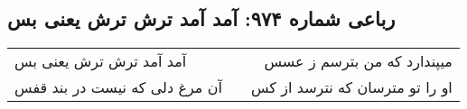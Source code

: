 \begin{center}
\section*{رباعی شماره ۹۷۴: آمد آمد ترش ترش یعنی بس}
\label{sec:0974}
\begin{longtable}{l p{0.5cm} r}
آمد آمد ترش ترش یعنی بس
&&
میپندارد که من بترسم ز عسس
\\
آن مرغ دلی که نیست در بند قفس
&&
او را تو مترسان که نترسد از کس
\\
\end{longtable}
\end{center}
